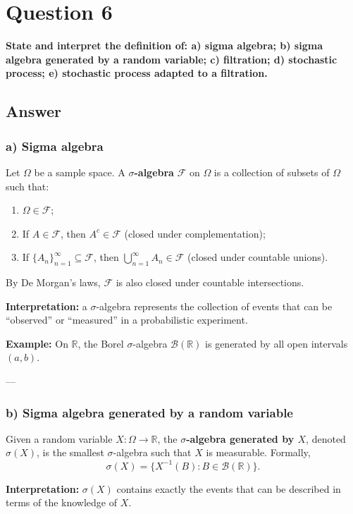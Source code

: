 \documentclass[12pt,a4paper]{book}
\theoremstyle{remark}
\newcommand{\RR}{\mathbb{R}}
\newcommand{\F}{\mathcal{F}}          %
\begin{document}
\newpage
\section{Question 6}
\textbf{State and interpret the definition of:  
a) sigma algebra;  
b) sigma algebra generated by a random variable;  
c) filtration;  
d) stochastic process;  
e) stochastic process adapted to a filtration.}

\subsection*{Answer}

\subsubsection*{a) Sigma algebra}
Let $\Omega$ be a sample space. A \textbf{$\sigma$-algebra} $\F$ on $\Omega$ is a collection of subsets of $\Omega$ such that:
\begin{enumerate}[label=\roman*)]
    \item $\Omega \in \F$;
    \item If $A \in \F$, then $A^c \in \F$ (closed under complementation);
    \item If $\{A_n\}_{n=1}^\infty \subseteq \F$, then $\bigcup_{n=1}^\infty A_n \in \F$ (closed under countable unions).
\end{enumerate}
By De Morgan’s laws, $\F$ is also closed under countable intersections.  

\textbf{Interpretation:} a $\sigma$-algebra represents the collection of events that can be “observed” or “measured” in a probabilistic experiment.  

\textbf{Example:} On $\RR$, the Borel $\sigma$-algebra $\mathcal{B}(\RR)$ is generated by all open intervals $(a,b)$.

---

\subsubsection*{b) Sigma algebra generated by a random variable}
Given a random variable $X:\Omega \to \RR$, the \textbf{$\sigma$-algebra generated by $X$}, denoted $\sigma(X)$, is the smallest $\sigma$-algebra such that $X$ is measurable. Formally,
\[
\sigma(X) = \{ X^{-1}(B) : B \in \mathcal{B}(\RR)\}.
\]

\textbf{Interpretation:} $\sigma(X)$ contains exactly the events that can be described in terms of the knowledge of $X$.
\end{document}
